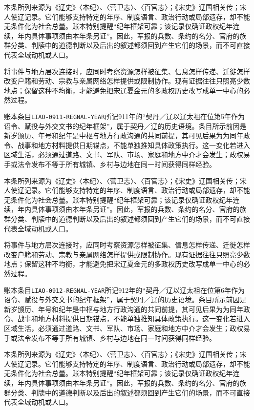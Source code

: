 本条所列来源为《辽史》〈本纪〉、〈营卫志〉、〈百官志〉；《宋史》辽国相关传；宋人使辽记录。它们能够支持特定的年序、制度语言、政治行动或局部遗存，却不能无条件化为社会总量。账本特别提醒“纪年框架可靠；该记录仅确证政权纪年连续，年内具体事项须由本年条另证”。因此，军报的兵数、条约的名分、官府的族群分类、判牍中的道德判断以及后出的叙述都须回到产生它们的场景，而不可直接代表全域动机或人口。

将事件与地方层次连接时，应同时考察资源怎样被征集、信息怎样传递、迁徙怎样改变户籍和劳动、宗教与亲属网络怎样提供或限制协作。现有证据往往只照亮少数地点；保留这种不均衡，才能避免把宋辽夏金元的多政权历史改写成单一中心的必然过程。

账本条目\texttt{LIAO-0911-REGNAL-YEAR}所记911年的“契丹／辽以辽太祖在位第5年作为诏令、赋役与外交文书的纪年框架”，属于契丹／辽的历史语境。条目所示前因是新岁颁历、年号和纪年是中枢与地方行政沟通的共同前提，其可见后果为为同年政令、战事和地方材料提供日期锚点，不能单独推知具体政策执行。这一变化若进入区域生活，必须通过道路、文书、军队、市场、家庭和地方中介才会发生；政权易手或法令发布不等于所有城镇、乡村与边地在同一时间获得同样经验。

本条所列来源为《辽史》〈本纪〉、〈营卫志〉、〈百官志〉；《宋史》辽国相关传；宋人使辽记录。它们能够支持特定的年序、制度语言、政治行动或局部遗存，却不能无条件化为社会总量。账本特别提醒“纪年框架可靠；该记录仅确证政权纪年连续，年内具体事项须由本年条另证”。因此，军报的兵数、条约的名分、官府的族群分类、判牍中的道德判断以及后出的叙述都须回到产生它们的场景，而不可直接代表全域动机或人口。

将事件与地方层次连接时，应同时考察资源怎样被征集、信息怎样传递、迁徙怎样改变户籍和劳动、宗教与亲属网络怎样提供或限制协作。现有证据往往只照亮少数地点；保留这种不均衡，才能避免把宋辽夏金元的多政权历史改写成单一中心的必然过程。

账本条目\texttt{LIAO-0912-REGNAL-YEAR}所记912年的“契丹／辽以辽太祖在位第6年作为诏令、赋役与外交文书的纪年框架”，属于契丹／辽的历史语境。条目所示前因是新岁颁历、年号和纪年是中枢与地方行政沟通的共同前提，其可见后果为为同年政令、战事和地方材料提供日期锚点，不能单独推知具体政策执行。这一变化若进入区域生活，必须通过道路、文书、军队、市场、家庭和地方中介才会发生；政权易手或法令发布不等于所有城镇、乡村与边地在同一时间获得同样经验。

本条所列来源为《辽史》〈本纪〉、〈营卫志〉、〈百官志〉；《宋史》辽国相关传；宋人使辽记录。它们能够支持特定的年序、制度语言、政治行动或局部遗存，却不能无条件化为社会总量。账本特别提醒“纪年框架可靠；该记录仅确证政权纪年连续，年内具体事项须由本年条另证”。因此，军报的兵数、条约的名分、官府的族群分类、判牍中的道德判断以及后出的叙述都须回到产生它们的场景，而不可直接代表全域动机或人口。

